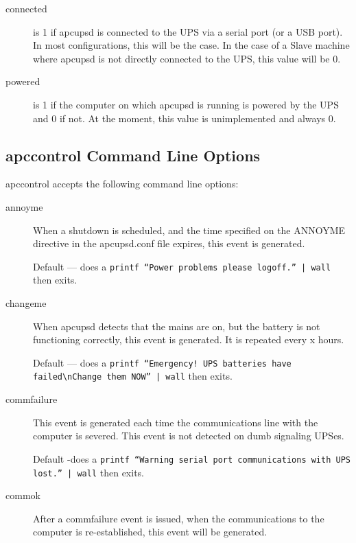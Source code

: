 {{{{{{{{{\begin{description}
\item [connected]
   is 1 if apcupsd is connected to the UPS via a serial port (or a USB port). In
most configurations, this will be the case. In the case of a Slave machine
where apcupsd is not directly connected to the UPS, this value will be 0.  

\item [powered]
   is 1 if the computer on which apcupsd is running is powered by the UPS and 0
if not.  At the moment, this value is unimplemented and always 0. 
\end{description}

\label{apccontrol-Command-Line-Options}

\subsection*{apccontrol Command Line Options}

apccontrol accepts the following command line options:  

\begin{description}

\item [annoyme]
   When a shutdown is scheduled, and the time specified on the ANNOYME directive
in the apcupsd.conf file expires, this event is generated.  

Default {---} does a {\tt printf ``Power problems please logoff.'' | wall}
then exits.  

\item [changeme]
   When apcupsd detects that the mains are on, but the battery is not functioning
correctly, this event is generated. It is repeated every x hours.  

Default {---} does a {\tt printf ``Emergency! UPS batteries have
failed\textbackslash{}nChange them NOW'' | wall} then exits.  

\item [commfailure]
   This event is generated each time the communications line with the computer is
severed. This event is not detected on dumb signaling UPSes.  

Default -does a {\tt printf ``Warning serial port communications with UPS
lost.'' | wall} then exits.  

\item [commok]
   After a commfailure event is issued, when the communications to the computer
is re-established, this event will be generated.  


\end{description}}}}}}}}}}
